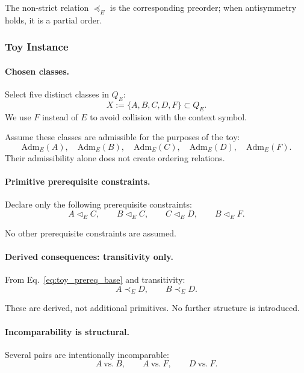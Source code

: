 \documentclass[aps,prx,onecolumn,11pt]{revtex4-2}
\theoremstyle{plain}
\theoremstyle{definition}
\theoremstyle{remark}
\begin{document}
The non-strict relation \(\preceq_E\) is the corresponding preorder;
when antisymmetry holds, it is a partial order.

\subsubsection{Toy Instance}
\label{toy:nontotal_ordering:instance}

\paragraph{Chosen classes.}

Select five distinct classes in \(Q_E\):
\[
X := \{A,B,C,D,F\}\subset Q_E.
\]
We use \(F\) instead of \(E\) to avoid collision with the context
symbol.

Assume these classes are admissible for the purposes of the toy:
\[
\mathrm{Adm}_E(A),\quad
\mathrm{Adm}_E(B),\quad
\mathrm{Adm}_E(C),\quad
\mathrm{Adm}_E(D),\quad
\mathrm{Adm}_E(F).
\]
Their admissibility alone does not create ordering relations.

\paragraph{Primitive prerequisite constraints.}

Declare only the following prerequisite constraints:
\begin{equation}
A\triangleleft_E C,
\qquad
B\triangleleft_E C,
\qquad
C\triangleleft_E D,
\qquad
B\triangleleft_E F.
\label{eq:toy_prereq_base}
\end{equation}

No other prerequisite constraints are assumed.

\paragraph{Derived consequences: transitivity only.}

From Eq.~\eqref{eq:toy_prereq_base} and transitivity:
\[
A\prec_E D,
\qquad
B\prec_E D.
\]

These are derived, not additional primitives. No further structure is
introduced.

\paragraph{Incomparability is structural.}

Several pairs are intentionally incomparable:
\[
A\ \text{vs.}\ B,
\qquad
A\ \text{vs.}\ F,
\qquad
D\ \text{vs.}\ F.
\]
\end{document}
